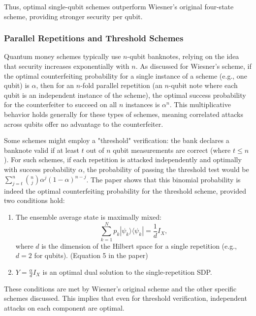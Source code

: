 \documentclass{article} %
\begin{document}
Thus, optimal single-qubit schemes outperform Wiesner’s original four-state scheme, providing stronger security per qubit.

\subsubsection{Parallel Repetitions and Threshold Schemes}

Quantum money schemes typically use $n$-qubit banknotes, relying on the idea that security increases exponentially with $n$. As discussed for Wiesner's scheme, if the optimal counterfeiting probability for a single instance of a scheme (e.g., one qubit) is $\alpha$, then for an $n$-fold parallel repetition (an $n$-qubit note where each qubit is an independent instance of the scheme), the optimal success probability for the counterfeiter to succeed on all $n$ instances is $\alpha^n$. This multiplicative behavior holds generally for these types of schemes, meaning correlated attacks across qubits offer no advantage to the counterfeiter.

Some schemes might employ a "threshold" verification: the bank declares a banknote valid if at least $t$ out of $n$ qubit measurements are correct (where $t \le n$). For such schemes, if each repetition is attacked independently and optimally with success probability $\alpha$, the probability of passing the threshold test would be $\sum_{j=t}^{n} \binom{n}{j} \alpha^j (1 - \alpha)^{n-j}$. The paper shows that this binomial probability is indeed the optimal counterfeiting probability for the threshold scheme, provided two conditions hold:
\begin{enumerate}
    \item The ensemble average state is maximally mixed: $$\sum_{k=1}^{N} p_k |\psi_k\rangle\langle\psi_k| = \frac{1}{d}I_X,$$ where $d$ is the dimension of the Hilbert space for a single repetition (e.g., $d=2$ for qubits). (Equation 5 in the paper)
    \item $Y = \frac{\alpha}{d}I_X$ is an optimal dual solution to the single-repetition SDP.
\end{enumerate}
These conditions are met by Wiesner's original scheme and the other specific schemes discussed. This implies that even for threshold verification, independent attacks on each component are optimal.

\end{document}
